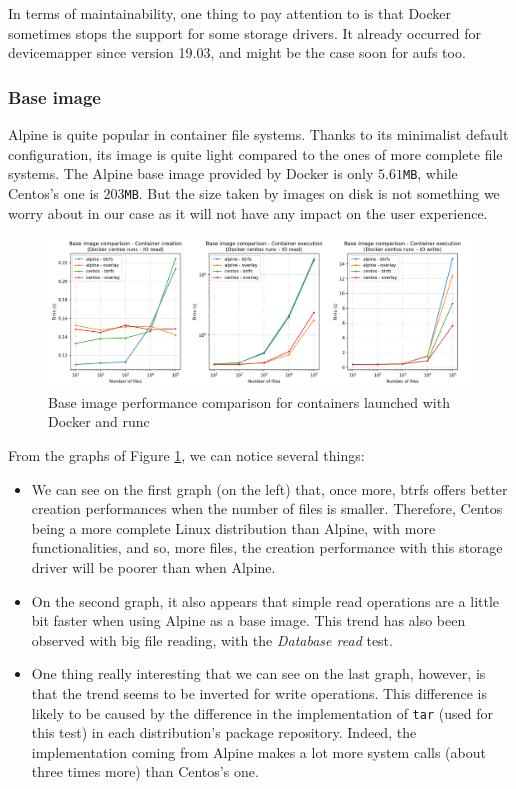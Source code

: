 In terms of maintainability, one thing to pay attention to is that Docker sometimes stops the support for some storage drivers.  It already occurred for devicemapper since version 19.03, and might be the case soon for aufs too.

\subsubsection{Base image}

Alpine is quite popular in container file systems.  Thanks to its minimalist default configuration, its image is quite light compared to the ones of more complete file systems.  The Alpine base image provided by Docker is only $5.61$\texttt{MB}, while Centos's one is $203$\texttt{MB}.  But the size taken by images on disk is not something we worry about in our case as it will not have any impact on the user experience.

\begin{figure}[h!]
  \begin{center}
    \includegraphics[width=\linewidth]{images/question-1-base-image.png}
    \caption{Base image performance comparison for containers launched with Docker and runc}
    \label{fig:q1:base-image}
  \end{center}
\end{figure}

From the graphs of Figure \ref{fig:q1:base-image}, we can notice several things:
\begin{itemize}
  \item We can see on the first graph (on the left) that, once more, btrfs offers better creation performances when the number of files is smaller.  Therefore, Centos being a more complete Linux distribution than Alpine, with more functionalities, and so, more files, the creation performance with this storage driver will be poorer than when Alpine.
  \item On the second graph, it also appears that simple read operations are a little bit faster when using Alpine as a base image.  This trend has also been observed with big file reading, with the \textit{Database read} test.
  \item One thing really interesting that we can see on the last graph, however, is that the trend seems to be inverted for write operations.  This difference is likely to be caused by the difference in the implementation of \texttt{tar} (used for this test) in each distribution's package repository.  Indeed, the implementation coming from Alpine makes a lot more system calls (about three times more) than Centos's one.
\end{itemize}

